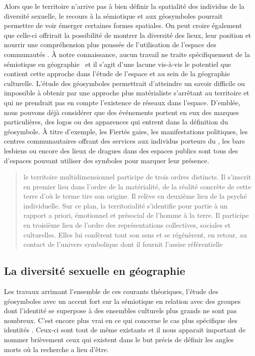 Alors que le territoire n'arrive pas à bien définir la spatialité des individus de la diversité sexuelle, le recours à la sémiotique et aux géosymboles pourrait permettre de voir émerger certaines formes spatiales. 
On peut croire également que celle-ci offrirait la possibilité de montrer la diversité des lieux, leur position et nourrir une compréhension plus poussée de l'utilisation de l'espace des communautés \lgbt{}. 
À notre connaissance, aucun travail ne traite spécifiquement de la sémiotique en géographie \qu\ et il s'agit d'une lacune vis-à-vis le potentiel que contient cette approche dans l'étude de l'espace et au sein de la géographie culturelle.
L'étude des géosymboles permettrait d'atteindre un savoir difficile ou impossible à obtenir par une approche plus matérialiste s'arrêtant au territoire et qui ne prendrait pas en compte l'existence de réseaux dans l'espace. 
D'emblée, nous pouvons déjà considérer que des événements  portent en eux des marques particulières, des logos ou des apparences qui entrent dans la définition du géosymbole.
À titre d'exemple, les Fiertés gaies, les manifestations politiques, les centres communautaires offrant des services aux individus porteurs du \vih, les bars lesbiens ou encore des lieux de dragues dans des espaces publics sont tous des d'espaces \lgbt{} pouvant utiliser des symboles pour marquer leur présence.

\blockquote[{\cite[108]{DiMeo1998}}][.]{\textelp{} le territoire multidimensionnel participe de trois ordres distincts. Il s'inscrit en premier lieu dans l'ordre de la matérialité, de la réalité concrète de cette terre d'où le terme tire son origine. Il relève en deuxième lieu de la psyché individuelle. Sur ce plan, la territorialité s'identifie pour partie à un rapport a priori, émotionnel et présocial de l'homme à la terre. Il participe en troisième lieu de l'ordre des représentations collectives, sociales et culturelles. Elles lui confèrent tout son sens et se régénèrent, en retour, au contact de l'univers symbolique dont il fournit l'assise référentielle}.



\subsection{La diversité sexuelle en géographie}
\label{sec:la_diversit_sexuelle_en_g_ographie}  
Les travaux arrimant l'ensemble de ces courants théoriques, l'étude des géosymboles avec un accent fort sur la sémiotique en relation avec des groupes dont l'identité se superpose à des ensembles culturels plus grands ne sont pas nombreux.
C'est encore plus vrai en ce qui concerne le cas plus spécifique des identités \lgbt{}. 
Ceux-ci sont tout de même existants et il nous apparait important de nommer brièvement ceux qui existent dans le but précis de définir les angles morts où la recherche a lieu d'être.

